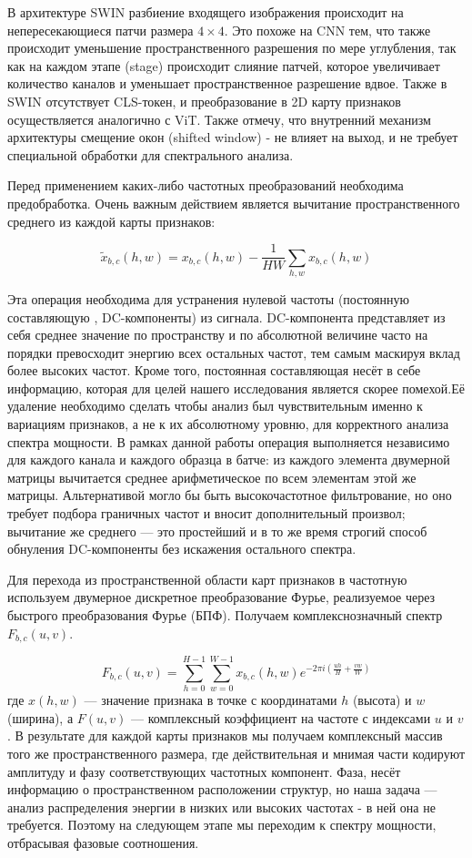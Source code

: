 В архитектуре SWIN разбиение входящего изображения происходит на непересекающиеся патчи размера $4\times4$. Это похоже на CNN тем, что также происходит уменьшение пространственного разрешения по мере углубления, так как на каждом этапе (stage) происходит слияние патчей, которое увеличивает количество каналов и уменьшает пространственное разрешение вдвое. Также в SWIN отсутствует CLS-токен, и преобразование в 2D карту признаков осуществляется аналогично с ViT.  Также отмечу, что внутренний механизм архитектуры смещение окон (shifted window) - не влияет на выход, и не требует специальной обработки для спектрального анализа.


Перед применением каких-либо частотных преобразований необходима предобработка.
Очень важным действием является вычитание пространственного среднего из каждой карты признаков:

\begin{equation}
    \tilde{x}_{b,c}(h,w) = x_{b,c}(h,w) - \frac{1}{HW} \sum_{h,w} x_{b,c}(h,w)
\end{equation}

Эта операция необходима для устранения нулевой частоты (постоянную составляющую , DC-компоненты) из сигнала. DC-компонента представляет из себя среднее значение по пространству и по абсолютной величине часто на порядки превосходит энергию всех остальных частот, тем самым маскируя вклад более высоких частот. Кроме того, постоянная составляющая несёт в себе информацию, которая для целей нашего исследования является скорее помехой.Её удаление необходимо сделать чтобы анализ был чувствительным именно к вариациям признаков, а не к их абсолютному уровню, для корректного анализа спектра мощности.
В рамках данной работы операция выполняется независимо для каждого канала и каждого образца в батче: из каждого элемента двумерной матрицы вычитается среднее арифметическое по всем элементам этой же матрицы. Альтернативой могло бы быть высокочастотное фильтрование, но оно требует подбора граничных частот и вносит дополнительный произвол; вычитание же среднего — это простейший и в то же время строгий способ обнуления DC-компоненты без искажения остального спектра.

Для перехода из пространственной области карт признаков в частотную используем двумерное дискретное преобразование Фурье, реализуемое через быстрого преобразования Фурье (БПФ). Получаем комплекснозначный спектр $F_{b,c}(u,v)$. 

\begin{equation}
    F_{b,c}(u, v) = \sum_{h=0}^{H-1} \sum_{w=0}^{W-1} x_{b,c}(h, w) e^{-2\pi i \left( \frac{uh}{H} + \frac{vw}{W} \right)}
\end{equation}
где $x(h,w)$ — значение признака в точке с координатами $h$ (высота) и $w$ (ширина), а $F(u,v)$ — комплексный коэффициент на частоте с индексами $u$ и $v$.
В результате для каждой карты признаков мы получаем комплексный массив того же пространственного размера, где действительная и мнимая части кодируют амплитуду и фазу соответствующих частотных компонент. Фаза, несёт информацию о пространственном расположении структур, но наша задача — анализ распределения энергии в низких или высоких частотах - в ней она не требуется. Поэтому на следующем этапе мы переходим к спектру мощности, отбрасывая фазовые соотношения.

